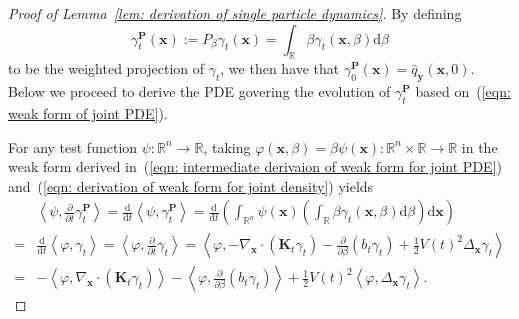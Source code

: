 \documentclass[10pt,a4paper]{amsart}
\newcommand{\dif}{{\mathrm{d}}}
\def\eqref#1{(\ref{#1})}
\def\mK{{\bm{K}}}
\def\mP{{\bm{P}}}
\def\vx{{\bm{x}}}
\def\vy{{\bm{y}}}
\begin{document}
\begin{proof}[Proof of Lemma~\ref{lem: derivation of single particle dynamics}]
    
    
    By defining 
    $$\gamma^{\mP}_t(\vx) := P_{\beta}\gamma_t(\vx) = \int_{\mathbb{R}}\beta\gamma_{t}(\vx,\beta)\dif\beta$$
    to be the weighted projection of $\gamma_t$, we then have that $\gamma^{\mP}_0(\vx) = \widehat{q}_{\vy}(\vx,0)$. 
    Below we proceed to derive the PDE govering the evolution of $\gamma^{\mP}_t$ based on~\eqref{eqn: weak form of joint PDE}. 
    
    For any test function $\psi:\mathbb{R}^n \rightarrow \mathbb{R}$, taking $\varphi(\vx,\beta) = \beta\psi(\vx):\mathbb{R}^{n} \times \mathbb{R} \rightarrow \mathbb{R}$ in the weak form derived in~\eqref{eqn: intermediate derivaion of weak form for joint PDE} and~\eqref{eqn: derivation of weak form for joint density} yields
    \begin{equation}
    \label{eqn: intermediate weak form for PDE of projected measure}
    \begin{aligned}
    &\left\langle\psi, \frac{\partial}{\partial t}\gamma^{\mP}_t\right\rangle = \frac{\dif}{\dif t}\left\langle\psi,\gamma^{\mP}_t\right\rangle= \frac{\dif}{\dif t}\left(\int_{\mathbb{R}^n}\psi(\vx)\left(\int_{\mathbb{R}}\beta\gamma_{t}(\vx,\beta)\dif\beta\right)\dif\vx\right) \\
    =& \frac{\dif}{\dif t}\left\langle\varphi,\gamma_t\right\rangle = \left\langle\varphi, \frac{\partial}{\partial t}\gamma_t\right\rangle
    = \left\langle\varphi, -\nabla_{\vx} \cdot \left(\mK_{t}\gamma_t\right) - \frac{\partial}{\partial \beta}\left(b_t \gamma_t\right)+\frac{1}{2}V(t)^2\Delta_{\vx}\gamma_t\right\rangle\\
    =& -\left\langle \varphi, \nabla_{\vx} \cdot \left(\mK_{t}\gamma_t\right) \right\rangle -\left\langle \varphi, \frac{\partial}{\partial \beta}\left(b_t \gamma_t\right) \right\rangle + \frac{1}{2}V(t)^2\left\langle \varphi, \Delta_{\vx}\gamma_t \right\rangle.
    \end{aligned}    
    \end{equation}


\end{proof}
\end{document}
